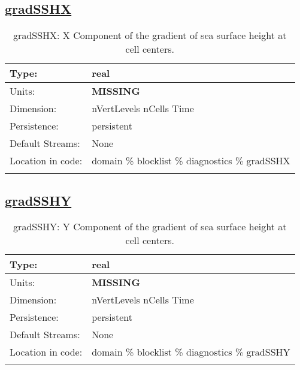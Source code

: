 \subsection[gradSSHX]{\hyperref[sec:var_tab_diagnostics]{gradSSHX}}
\label{subsec:var_sec_diagnostics_gradSSHX}
\begin{center}
\begin{longtable}{| p{2.0in} | p{4.0in} |}
        \hline 
        Type: & real \\
        \hline 
        Units: & {\bf \color{red} MISSING} \\
        \hline 
        Dimension: & nVertLevels nCells Time \\
        \hline 
        Persistence: & persistent \\
        \hline 
		 Default Streams: & None \\
        \hline 
		 Location in code: & domain \% blocklist \% diagnostics \% gradSSHX \\
		 \hline 
    \caption{gradSSHX: X Component of the gradient of sea surface height at cell centers.}
\end{longtable}
\end{center}
\subsection[gradSSHY]{\hyperref[sec:var_tab_diagnostics]{gradSSHY}}
\label{subsec:var_sec_diagnostics_gradSSHY}
\begin{center}
\begin{longtable}{| p{2.0in} | p{4.0in} |}
        \hline 
        Type: & real \\
        \hline 
        Units: & {\bf \color{red} MISSING} \\
        \hline 
        Dimension: & nVertLevels nCells Time \\
        \hline 
        Persistence: & persistent \\
        \hline 
		 Default Streams: & None \\
        \hline 
		 Location in code: & domain \% blocklist \% diagnostics \% gradSSHY \\
		 \hline 
    \caption{gradSSHY: Y Component of the gradient of sea surface height at cell centers.}
\end{longtable}
\end{center}
